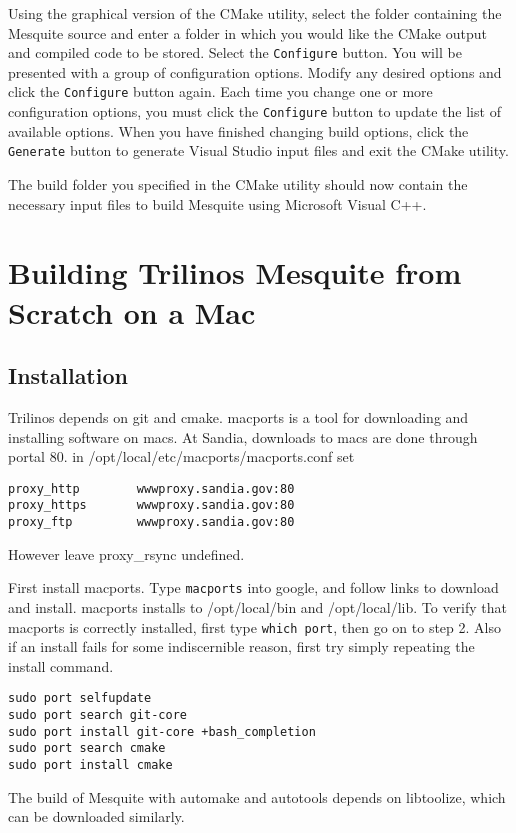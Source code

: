 Using the graphical version of the CMake utility, select the folder containing the Mesquite source and enter a folder in which you would like the CMake output and compiled code to be stored.  Select the \texttt{Configure} button.  You will be presented with a group of configuration options.  Modify any desired options and click the \texttt{Configure} button again.  Each time you change one or more configuration options, you must click the \texttt{Configure} button to update the list of available options.  When you have finished changing build options, click the \texttt{Generate} button to generate Visual Studio input files and exit the CMake utility.

The build folder you specified in the CMake utility should now contain the necessary input files to build Mesquite using Microsoft Visual C++.  

\section{Building Trilinos Mesquite from Scratch on a Mac}
\subsection{Installation}

Trilinos depends on git and cmake.
macports is a tool for downloading and installing software on macs.
At Sandia, downloads to macs are done through portal 80.
in /opt/local/etc/macports/macports.conf set 
\begin{verbatim}
proxy_http        wwwproxy.sandia.gov:80
proxy_https       wwwproxy.sandia.gov:80
proxy_ftp         wwwproxy.sandia.gov:80
\end{verbatim}
However leave proxy\_rsync undefined.


First install macports.  Type {\tt macports} into google, and follow links to download and install.
macports  installs to /opt/local/bin  and /opt/local/lib.
To verify that macports is correctly installed,  first  type {\tt which port},  then go on to step 2.
Also if an install fails for some indiscernible reason, 
first try simply repeating the install command.

\begin{verbatim}
sudo port selfupdate   
sudo port search git-core
sudo port install git-core +bash_completion
sudo port search cmake
sudo port install cmake   
\end{verbatim}
The build of Mesquite with automake and autotools depends on  libtoolize, which can be downloaded similarly.

